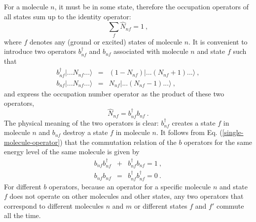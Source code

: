 For a molecule $n$, it must be in some state, therefore the occupation operators of all states sum up to the identity
operator:
\begin{equation}
\sum_{f}\hat{N}_{nf} = 1 \ , \label{must-be-in-a-state}
\end{equation}
where $f$ denotes any (ground or excited) states  of molecule $n$. 
It is convenient to introduce two operators $b_{nf}^{\dagger}$ and $b_{nf}$ associated with molecule $n$ and state $f$ such that
\begin{eqnarray}
b_{nf}^{\dagger} |...N_{nf}...\rangle &=& (1-N_{nf})|...(N_{nf}+1)...\rangle \ , \nonumber \\
b_{nf} |...N_{nf}...\rangle &=& N_{nf}|...(N_{nf}-1)...\rangle \ , \label{single-molecule-operator}
\end{eqnarray}
and express the occupation number operator as the product of these two operators,
\begin{equation}
\hat{N}_{nf} =b_{nf}^{\dagger} b_{nf} \ .
\end{equation}
The physical meaning of the two operators is clear: $b_{nf}^{\dagger}$ creates a state $f$ in molecule $n$ and 
$b_{nf}$ destroy a state $f$ in molecule $n$.  It follows from Eq. (\ref{single-molecule-operator}) that the 
commutation relation of the $b$ operators for the same energy level of the same molecule is given by
\begin{eqnarray}
b_{nf}b_{nf}^{\dagger} &+& b_{nf}^{\dagger}b_{nf} = 1 \ , \nonumber \\
b_{nf}b_{nf}&=&b_{nf}^{\dagger}b_{nf}^{\dagger} =0 \ . \label{commutation-relation-single-molecule}
\end{eqnarray}
For different $b$ operators, because an operator for a specific molecule $n$ and state $f$ does not operate on other molecules and other states, any two operators that correspond to different molecules $n$ and $m$ or different states $f$ and $f'$ commute all the time. 

